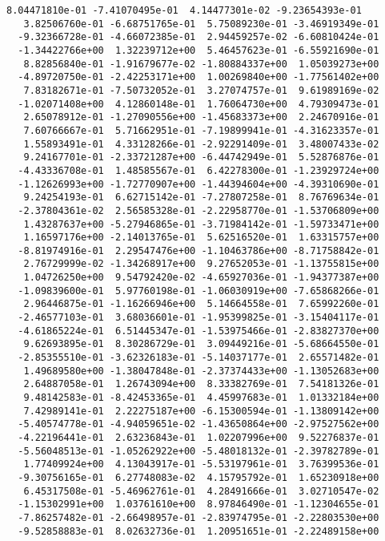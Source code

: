 \documentclass[11pt]{article}
\begin{document}
\begin{Verbatim}[commandchars=\\\{\}]
   8.04471810e-01 -7.41070495e-01  4.14477301e-02 -9.23654393e-01
   3.82506760e-01 -6.68751765e-01  5.75089230e-01 -3.46919349e-01
  -9.32366728e-01 -4.66072385e-01  2.94459257e-02 -6.60810424e-01
  -1.34422766e+00  1.32239712e+00  5.46457623e-01 -6.55921690e-01
   8.82856840e-01 -1.91679677e-02 -1.80884337e+00  1.05039273e+00
  -4.89720750e-01 -2.42253171e+00  1.00269840e+00 -1.77561402e+00
   7.83182671e-01 -7.50732052e-01  3.27074757e-01  9.61989169e-02
  -1.02071408e+00  4.12860148e-01  1.76064730e+00  4.79309473e-01
   2.65078912e-01 -1.27090556e+00 -1.45683373e+00  2.24670916e-01
   7.60766667e-01  5.71662951e-01 -7.19899941e-01 -4.31623357e-01
   1.55893491e-01  4.33128266e-01 -2.92291409e-01  3.48007433e-02
   9.24167701e-01 -2.33721287e+00 -6.44742949e-01  5.52876876e-01
  -4.43336708e-01  1.48585567e-01  6.42278300e-01 -1.23929724e+00
  -1.12626993e+00 -1.72770907e+00 -1.44394604e+00 -4.39310690e-01
   9.24254193e-01  6.62715142e-01 -7.27807258e-01  8.76769634e-01
  -2.37804361e-02  2.56585328e-01 -2.22958770e-01 -1.53706809e+00
   1.43287637e+00 -5.27946865e-01 -3.71984142e-01 -1.59733471e+00
   1.16597176e+00 -2.14013765e-01  5.62516520e-01  1.63315757e+00
  -8.81974916e-01  2.29547476e+00 -1.10463786e+00 -8.71758842e-01
   2.76729999e-02 -1.34268917e+00  9.27652053e-01 -1.13755815e+00
   1.04726250e+00  9.54792420e-02 -4.65927036e-01 -1.94377387e+00
  -1.09839600e-01  5.97760198e-01 -1.06030919e+00 -7.65868266e-01
   2.96446875e-01 -1.16266946e+00  5.14664558e-01  7.65992260e-01
  -2.46577103e-01  3.68036601e-01 -1.95399825e-01 -3.15404117e-01
  -4.61865224e-01  6.51445347e-01 -1.53975466e-01 -2.83827370e+00
   9.62693895e-01  8.30286729e-01  3.09449216e-01 -5.68664550e-01
  -2.85355510e-01 -3.62326183e-01 -5.14037177e-01  2.65571482e-01
   1.49689580e+00 -1.38047848e-01 -2.37374433e+00 -1.13052683e+00
   2.64887058e-01  1.26743094e+00  8.33382769e-01  7.54181326e-01
   9.48142583e-01 -8.42453365e-01  4.45997683e-01  1.01332184e+00
   7.42989141e-01  2.22275187e+00 -6.15300594e-01 -1.13809142e+00
  -5.40574778e-01 -4.94059651e-02 -1.43650864e+00 -2.97527562e+00
  -4.22196441e-01  2.63236843e-01  1.02207996e+00  9.52276837e-01
  -5.56048513e-01 -1.05262922e+00 -5.48018132e-01 -2.39782789e-01
   1.77409924e+00  4.13043917e-01 -5.53197961e-01  3.76399536e-01
  -9.30756165e-01  6.27748083e-02  4.15795792e-01  1.65230918e+00
   6.45317508e-01 -5.46962761e-01  4.28491666e-01  3.02710547e-02
  -1.15302991e+00  1.03761610e+00  8.97846490e-01 -1.12304655e-01
  -7.86257482e-01 -2.66498957e-01 -2.83974795e-01 -2.22803530e+00
  -9.52858883e-01  8.02632736e-01  1.20951651e-01 -2.22489158e+00

\end{Verbatim}
\end{document}

